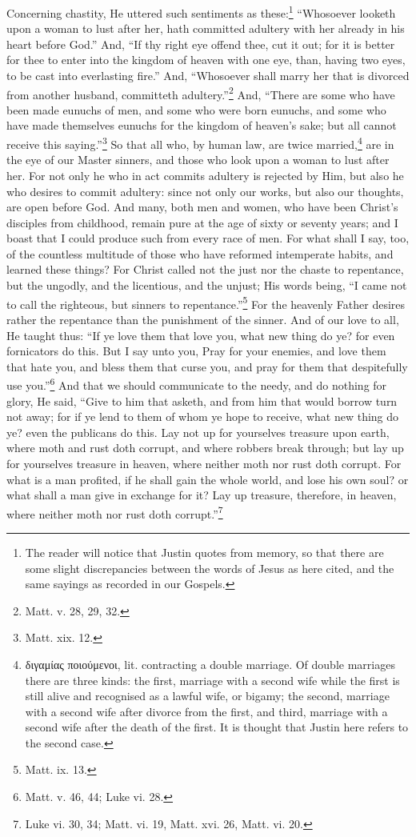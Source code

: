 Concerning chastity, He uttered such sentiments as these:\footnote{The reader will notice that Justin quotes from memory, so that there are some slight discrepancies between the words of Jesus as here cited, and the same sayings as recorded in our Gospels.} “Whosoever looketh upon a woman to lust after her, hath committed adultery with her already in his heart before God.” And, “If thy right eye offend thee, cut it out; for it is better for thee to enter into the kingdom of heaven with one eye, than, having two eyes, to be cast into everlasting fire.” And, “Whosoever shall marry her that is divorced from another husband, committeth adultery.”\footnote{Matt. v. 28, 29, 32.} And, “There are some who have been made eunuchs of men, and some who were born eunuchs, and some who have made themselves eunuchs for the kingdom of heaven’s sake; but all cannot receive this saying.”\footnote{Matt. xix. 12.} So that all who, by human law, are twice married,\footnote{\textgreek{διγαμίας ποιούμενοι}, lit. contracting a double marriage. Of double marriages there are three kinds: the first, marriage with a second wife while the first is still alive and recognised as a lawful wife, or bigamy; the second, marriage with a second wife after divorce from the first, and third, marriage with a second wife after the death of the first. It is thought that Justin here refers to the second case.} are in the eye of our Master sinners, and those who look upon a woman to lust after her. For not only he who in act commits adultery is rejected by Him, but also he who desires to commit adultery: since not only our works, but also our thoughts, are open before God. And many, both men and women, who have been Christ’s disciples from childhood, remain pure at the age of sixty or seventy years; and I boast that I could produce such from every race of men. For what shall I say, too, of the countless multitude of those who have reformed intemperate habits, and learned these things? For Christ called not the just nor the chaste to repentance, but the ungodly, and the licentious, and the unjust; His words being, “I came not to call the righteous, but sinners to repentance.”\footnote{Matt. ix. 13.} For the heavenly Father desires rather the repentance than the punishment of the sinner. And of our love to all, He taught thus: “If ye love them that love you, what new thing do ye? for even fornicators do this. But I say unto you, Pray for your enemies, and love them that hate you, and bless them that curse you, and pray for them that despitefully use you.”\footnote{Matt. v. 46, 44; Luke vi. 28.} And that we should communicate to the needy, and do nothing for glory, He said, “Give to him that asketh, and from him that would borrow turn not away; for if ye lend to them of whom ye hope to receive, what new thing do ye? even the publicans do this. Lay not up for yourselves treasure upon earth, where moth and rust doth corrupt, and where robbers break through; but lay up for yourselves treasure in heaven, where neither moth nor rust doth corrupt. For what is a man profited, if he shall gain the whole world, and lose his own soul? or what shall a man give in exchange for it? Lay up treasure, therefore, in heaven, where neither moth nor rust doth corrupt.”\footnote{Luke vi. 30, 34; Matt. vi. 19, Matt. xvi. 26, Matt. vi. 20.} 